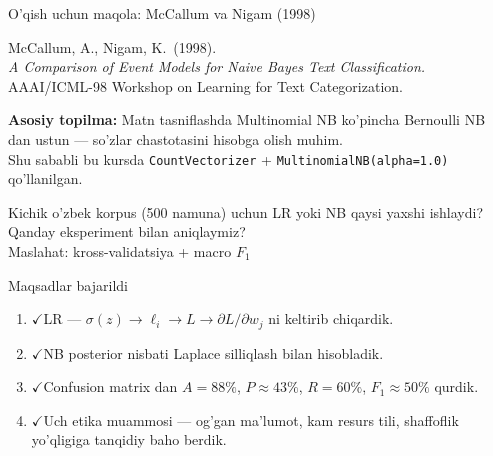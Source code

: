 \documentclass[aspectratio=169,11pt]{beamer}
\newcommand{\bajarildi}{{\color{deepgreen}\large$\checkmark$}\;}
\begin{document}
\begin{frame}{O'qish uchun maqola: McCallum va Nigam (1998)}
  \begin{tcolorbox}[defbox,title=Maqola]
    \small
    McCallum, A., Nigam, K.\ (1998).\\
    \textit{A Comparison of Event Models for Naive Bayes
    Text Classification.}\\
    AAAI/ICML-98 Workshop on Learning for Text Categorization.
  \end{tcolorbox}
  \vspace{5pt}
  \small
  \textbf{Asosiy topilma:}
  Matn tasniflashda Multinomial NB ko'pincha Bernoulli NB dan ustun ---
  so'zlar chastotasini hisobga olish muhim.\\[4pt]
  Shu sababli bu kursda \texttt{CountVectorizer} + \texttt{MultinomialNB(alpha=1.0)} qo'llanilgan.\\[6pt]
  \begin{tcolorbox}[warnbox,title=Muhokama savoli (2-amaliyotgacha o'ylang)]
    \small
    Kichik o'zbek korpus (500 namuna) uchun LR yoki NB qaysi
    yaxshi ishlaydi?  Qanday eksperiment bilan aniqlaymiz?\\
    \textcolor{halfgray}{\footnotesize
      Maslahat: kross-validatsiya + macro $F_1$}
  \end{tcolorbox}
\end{frame}

\begin{frame}{Maqsadlar bajarildi}
  \begin{enumerate}\setlength{\itemsep}{9pt}
    \item \bajarildi  LR ---
          $\sigma(z)\to\ell_i\to L\to\partial L/\partial w_j$
          ni keltirib chiqardik.
    \item \bajarildi  NB posterior nisbati Laplace silliqlash bilan hisobladik.
    \item \bajarildi Confusion matrix dan
          $A{=}88\%$, $P{\approx}43\%$, $R{=}60\%$, $F_1{\approx}50\%$
          qurdik.
    \item \bajarildi Uch etika muammosi ---
          og'gan ma'lumot, kam resurs tili, shaffoflik yo'qligiga tanqidiy baho berdik.
  \end{enumerate}
\end{frame}
\end{document}
